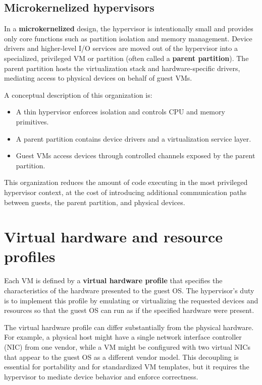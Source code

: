 \documentclass[11pt,a4paper,openany]{report}
\begin{document}
\subsection{Microkernelized hypervisors}

In a \textbf{microkernelized} design, the hypervisor is intentionally small and provides only core functions such as partition isolation and memory management. Device drivers and higher-level I/O services are moved out of the hypervisor into a specialized, privileged VM or partition (often called a \textbf{parent partition}). The parent partition hosts the virtualization stack and hardware-specific drivers, mediating access to physical devices on behalf of guest VMs.

A conceptual description of this organization is:

\begin{itemize}
\item A thin hypervisor enforces isolation and controls CPU and memory primitives.
\item A parent partition contains device drivers and a virtualization service layer.
\item Guest VMs access devices through controlled channels exposed by the parent partition.
\end{itemize}

This organization reduces the amount of code executing in the most privileged hypervisor context, at the cost of introducing additional communication paths between guests, the parent partition, and physical devices.

\section{Virtual hardware and resource profiles}

Each VM is defined by a \textbf{virtual hardware profile} that specifies the characteristics of the hardware presented to the guest OS. The hypervisor's duty is to implement this profile by emulating or virtualizing the requested devices and resources so that the guest OS can run as if the specified hardware were present.

The virtual hardware profile can differ substantially from the physical hardware. For example, a physical host might have a single network interface controller (NIC) from one vendor, while a VM might be configured with two virtual NICs that appear to the guest OS as a different vendor model. This decoupling is essential for portability and for standardized VM templates, but it requires the hypervisor to mediate device behavior and enforce correctness.
\end{document}
